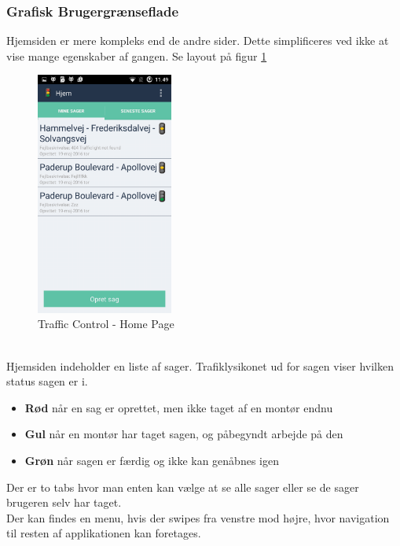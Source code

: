 	\subsubsection{Grafisk Brugergrænseflade}
	Hjemsiden er mere kompleks end de andre sider. Dette simplificeres ved ikke at vise mange egenskaber af gangen. Se layout på figur \ref{fig: Traffic Control - Home Page}
	\begin{figure}[h!]
		\begin{center}
			\includegraphics[height=8cm]{Android/Billeder/AndroidHomePage}
		\end{center}
		\caption{Traffic Control - Home Page}
		\label{fig: Traffic Control - Home Page}
	\end{figure}
	\\
Hjemsiden indeholder en liste af sager. Trafiklysikonet ud for sagen viser hvilken status sagen er i.
\begin{itemize}
	\item \textbf{Rød} når en sag er oprettet, men ikke taget af en montør endnu
	\item \textbf{Gul} når en montør har taget sagen, og påbegyndt arbejde på den
	\item \textbf{Grøn} når sagen er færdig og ikke kan genåbnes igen
\end{itemize}
Der er to tabs hvor man enten kan vælge at se alle sager eller se de sager brugeren selv har taget.
\\Der kan findes en menu, hvis der swipes fra venstre mod højre, hvor navigation til resten af applikationen kan foretages.
	
	
